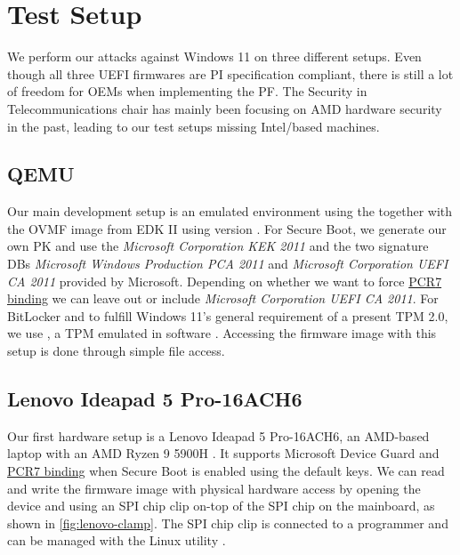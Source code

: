 
\chapter{Test Setup}
\label{sec:test-setup}

We perform our attacks against Windows 11 on three different setups.
Even though all three \ac{UEFI} firmwares are \ac{PI} specification compliant, there is still a lot of freedom for \acp{OEM} when implementing the \ac{PF}.
The Security in Telecommunications chair has mainly been focusing on \ac{AMD} hardware security in the past, leading to our test setups missing Intel\-/based machines.

\section{\acs{QEMU}}
\label{sec:test-setup:qemu}

Our main development setup is an emulated environment using the  \cite{qemu} together with the \ac{OVMF} image from \ac{EDK} II using version .
For Secure Boot, we generate our own \ac{PK} and use the \emph{Microsoft Corporation \acs{KEK}  2011} and the two signature \acp{DB} \emph{Microsoft Windows Production PCA 2011} and \emph{Microsoft Corporation UEFI CA 2011} provided by Microsoft.
Depending on whether we want to force \hyperlink{pcr7-binding}{\ac{PCR}7 binding} we can leave out or include \emph{Microsoft Corporation UEFI CA 2011}.
For BitLocker and to fulfill Windows 11's general requirement of a present \ac{TPM} 2.0, we use , a \ac{TPM} emulated in software \cite{swtpm}.
Accessing the firmware image with this setup is done through simple file access.

\section{Lenovo Ideapad 5 Pro-16ACH6}
\label{sec:test-setup:lenovo}

Our first hardware setup is a Lenovo Ideapad 5 Pro-16ACH6, an \ac{AMD}-based laptop with an \ac{AMD} Ryzen 9 5900H \cite{lenovo-ideapad}.
It supports Microsoft Device Guard and \hyperlink{pcr7-binding}{\ac{PCR}7 binding} when Secure Boot is enabled using the default keys.
We can read and write the firmware image with physical hardware access by opening the device and using an \ac{SPI} chip clip on-top of the \ac{SPI} chip on the mainboard, as shown in \autoref{fig:lenovo-clamp}.
The \ac{SPI} chip clip is connected to a programmer and can be managed with the Linux utility .

